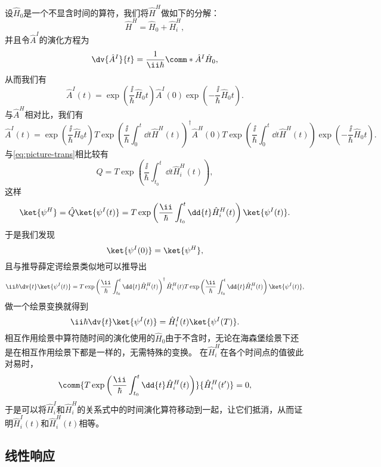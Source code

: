 设$\hat{H}_0$是一个不显含时间的算符，我们将$\hat{H}^H$做如下的分解：
\begin{equation}
    \hat{H}^H = \hat{H}_0 + \hat{H}^H_i,
\end{equation}
并且令$\hat{A}^I$的演化方程为
\begin{equation}
    \dv{\hat{A}^I}{t} = \frac{1}{\ii \hbar} \comm*{\hat{A}^I}{\hat{H}_0},
\end{equation}
从而我们有
\begin{equation}
    \hat{A}^I (t) = \exp \left( \frac{\ii}{\hbar} \hat{H}_0 t \right) \hat{A}^I (0) \exp \left( - \frac{\ii}{\hbar} \hat{H}_0 t \right).
\end{equation}
与$\hat{A}^H$相对比，我们有
\[
    \hat{A}^I (t) = \exp\left(\frac{\ii}{\hbar}\hat{H}_0 t\right) T \exp \left( \frac{\ii}{\hbar} \int_0^t \dd{t} \hat{H}^H(t) \right)^\dagger \hat{A}^H(0) T \exp \left( \frac{\ii}{\hbar} \int_0^t \dd{t} \hat{H}^H(t) \right) \exp\left(-\frac{\ii}{\hbar}\hat{H}_0 t\right).
\]
与\eqref{eq:picture-trans}相比较有
\[
    \hat{Q} = T \exp \left( \frac{\ii}{\hbar} \int_{t_0}^t \dd{t} \hat{H}^H_i (t) \right),
\]
这样
\[
    \ket{\psi^H} = \hat{Q} \ket{\psi^I (t)} = T \exp \left( \frac{\ii}{\hbar} \int_{t_0}^t \dd{t} \hat{H}^H_i (t) \right) \ket{\psi^I (t)}.
\]
于是我们发现
\[
    \ket{\psi^I (0)} = \ket{\psi^H},
\]
且与推导薛定谔绘景类似地可以推导出
\[
    \ii \hbar \dv{t} \ket{\psi^I (t)} = T \exp \left( \frac{\ii}{\hbar} \int_{t_0}^t \dd{t} \hat{H}^H_i (t) \right)^\dagger \hat{H}_i^H (t) T \exp \left( \frac{\ii}{\hbar} \int_{t_0}^t \dd{t} \hat{H}^H_i (t) \right) \ket{\psi^I(t)},
\]
做一个绘景变换就得到
\begin{equation}
    \ii \hbar \dv{t} \ket{\psi^I (t)} = \hat{H}^I_i (t) \ket{\psi^I (T)}.
    
\end{equation}
相互作用绘景中算符随时间的演化使用的$\hat{H}_0$由于不含时，无论在海森堡绘景下还是在相互作用绘景下都是一样的，无需特殊的变换。
在$\hat{H}_i^H$在各个时间点的值彼此对易时，
\[
    \comm{T \exp \left( \frac{\ii}{\hbar} \int_{t_0}^t \dd{t} \hat{H}^H_i (t) \right)}{\hat{H}_i^H(t')} = 0,
\]
于是可以将$\hat{H}^I_i$和$\hat{H}^H_i$的关系式中的时间演化算符移动到一起，让它们抵消，从而证明$\hat{H}^I_i(t)$和$\hat{H}^H_i(t)$相等。


\subsection{线性响应}\label{sec:linear-response}

